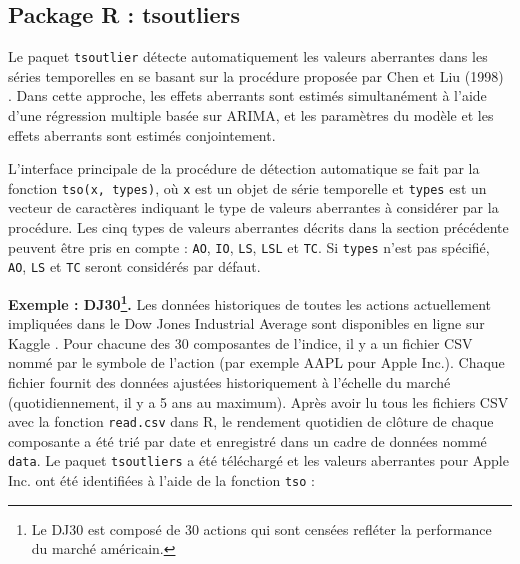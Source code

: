 \subsection{Package R : tsoutliers} Le paquet \verb|tsoutlier| détecte automatiquement les valeurs aberrantes dans les séries temporelles en se basant sur la procédure proposée par Chen et Liu (1998) \cite{chenliu}. Dans cette approche, les effets aberrants sont estimés simultanément à l'aide d'une régression multiple basée sur ARIMA, et les paramètres du modèle et les effets aberrants sont estimés conjointement. \par L'interface principale de la procédure de détection automatique se fait par la fonction \verb|tso(x, types)|, où \verb|x| est un objet de série temporelle et \verb|types| est un vecteur de caractères indiquant le type de valeurs aberrantes à considérer par la procédure. Les cinq types de valeurs aberrantes décrits dans la section précédente peuvent être pris en compte : \verb|AO|, \verb|IO|, \verb|LS|, \verb|LSL| et \verb|TC|. Si \verb|types| n'est pas spécifié, \verb|AO|, \verb|LS| et \verb|TC| seront considérés par défaut. \par \textbf{Exemple : DJ30\footnote{Le DJ30 est composé de 30 actions qui sont censées refléter la performance du marché américain.}.} Les données historiques de toutes les actions actuellement impliquées dans le Dow Jones Industrial Average sont disponibles en ligne sur Kaggle \cite{dj30}. Pour chacune des 30 composantes de l'indice, il y a un fichier CSV nommé par le symbole de l'action (par exemple AAPL pour Apple Inc.). Chaque fichier fournit des données ajustées historiquement à l'échelle du marché (quotidiennement, il y a 5 ans au maximum). Après avoir lu tous les fichiers CSV avec la fonction \verb|read.csv| dans R, le rendement quotidien de clôture de chaque composante a été trié par date et enregistré dans un cadre de données nommé \verb|data|. Le paquet \verb|tsoutliers| a été téléchargé et les valeurs aberrantes pour Apple Inc. ont été identifiées à l'aide de la fonction \verb|tso| :

